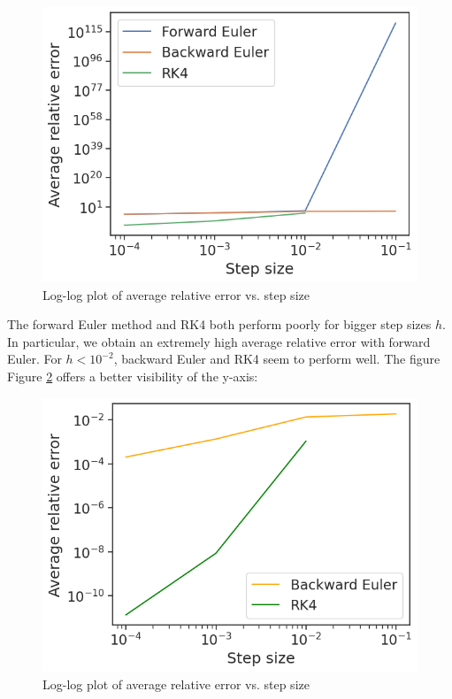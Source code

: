 \documentclass[12pt, oneside]{report}   	%
\begin{document}
\begin{figure}[t]
    \centering
    \includegraphics[scale=0.5]{test_numericals_1.png}
    \caption{Log-log plot of average relative error vs. step size}
    \label{fig:whichmethod1}
\end{figure}

\noindent The forward Euler method and RK4 both perform poorly for bigger step sizes $h$. In particular, we obtain an extremely high average relative error with forward Euler. For $h<10^{-2}$, backward Euler and RK4 seem to perform well. The figure Figure \ref{fig:whichmethod2} offers a better visibility of the y-axis:

\begin{figure}[t]
    \centering
    \includegraphics[scale=0.5]{test_numericals_2.png}
    \caption{Log-log plot of average relative error vs. step size}
    \label{fig:whichmethod2}
\end{figure}
\end{document}
